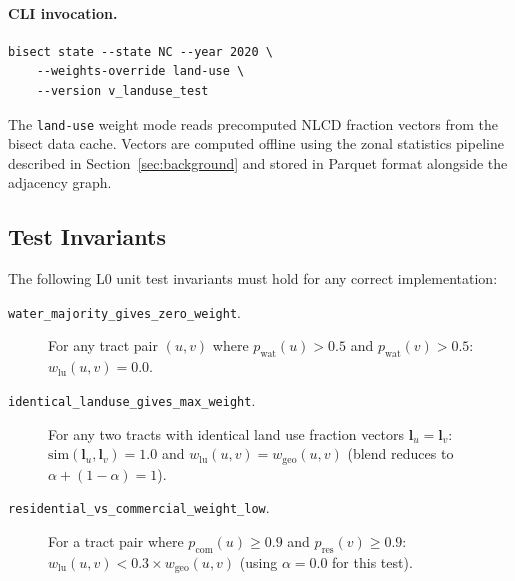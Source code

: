 \paragraph{CLI invocation.}
\begin{verbatim}
bisect state --state NC --year 2020 \
    --weights-override land-use \
    --version v_landuse_test
\end{verbatim}
The \texttt{land-use} weight mode reads precomputed NLCD fraction vectors
from the bisect data cache.
Vectors are computed offline using the zonal statistics pipeline described
in Section~\ref{sec:background} and stored in Parquet format alongside
the adjacency graph.

\subsection{Test Invariants}

The following L0 unit test invariants must hold for any correct implementation:

\begin{description}
  \item[\texttt{water\_majority\_gives\_zero\_weight}.]
    For any tract pair $(u, v)$ where $p_{\mathrm{wat}}(u) > 0.5$ and
    $p_{\mathrm{wat}}(v) > 0.5$: $w_{\mathrm{lu}}(u, v) = 0.0$.
  \item[\texttt{identical\_landuse\_gives\_max\_weight}.]
    For any two tracts with identical land use fraction vectors
    $\mathbf{l}_u = \mathbf{l}_v$: $\mathrm{sim}(\mathbf{l}_u, \mathbf{l}_v) = 1.0$
    and $w_{\mathrm{lu}}(u, v) = w_{\mathrm{geo}}(u, v)$ (blend reduces to $\alpha + (1-\alpha) = 1$).
  \item[\texttt{residential\_vs\_commercial\_weight\_low}.]
    For a tract pair where $p_{\mathrm{com}}(u) \geq 0.9$ and
    $p_{\mathrm{res}}(v) \geq 0.9$: $w_{\mathrm{lu}}(u, v) < 0.3 \times w_{\mathrm{geo}}(u, v)$
    (using $\alpha = 0.0$ for this test).
\end{description}
